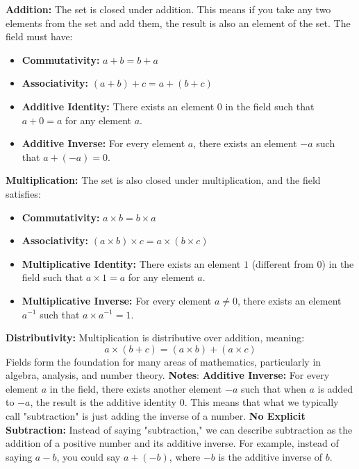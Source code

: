 \documentclass{report}
\begin{document}
\begin{itemize}
            \bigbreak \noindent 
            \textbf{Addition:} The set is closed under addition. This means if you take any two elements from the set and add them, the result is also an element of the set. The field must have:
            \begin{itemize}
                \item \textbf{Commutativity:} \(a + b = b + a\)
                \item \textbf{Associativity:} \((a + b) + c = a + (b + c)\)
                \item \textbf{Additive Identity:} There exists an element \(0\) in the field such that \(a + 0 = a\) for any element \(a\).
                \item \textbf{Additive Inverse:} For every element \(a\), there exists an element \(-a\) such that \(a + (-a) = 0\).
            \end{itemize}
            \textbf{Multiplication:} The set is also closed under multiplication, and the field satisfies:
            \begin{itemize}
                \item \textbf{Commutativity:} \(a \times b = b \times a\)
                \item \textbf{Associativity:} \((a \times b) \times c = a \times (b \times c)\)
                \item \textbf{Multiplicative Identity:} There exists an element \(1\) (different from \(0\)) in the field such that \(a \times 1 = a\) for any element \(a\).
                \item \textbf{Multiplicative Inverse:} For every element \(a \neq 0\), there exists an element \(a^{-1}\) such that \(a \times a^{-1} = 1\).
            \end{itemize}
            \textbf{Distributivity:} Multiplication is distributive over addition, meaning:
            \[
                a \times (b + c) = (a \times b) + (a \times c)
            \]
            Fields form the foundation for many areas of mathematics, particularly in algebra, analysis, and number theory.
            \bigbreak \noindent 
            \textbf{Notes}:
            \textbf{Additive Inverse:} For every element \(a\) in the field, there exists another element \(-a\) such that when \(a\) is added to \(-a\), the result is the additive identity \(0\). This means that what we typically call "subtraction" is just adding the inverse of a number.
            \bigbreak \noindent 
            \textbf{No Explicit Subtraction:} Instead of saying "subtraction," we can describe subtraction as the addition of a positive number and its additive inverse. For example, instead of saying \(a - b\), you could say \(a + (-b)\), where \(-b\) is the additive inverse of \(b\).

\end{itemize}
\end{document}
